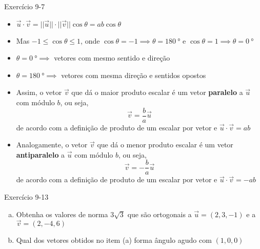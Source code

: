 \begin{frame}{Exercício 9-7}
    \begin{itemize}
        \item \(
            \vec{u}\cdot\vec{v}=||\vec{u}||\cdot ||\vec{v}||\cos{\theta}=
            ab\cos{\theta}
            \)
        \item Mas \(-1 \leq \cos{\theta} \leq 1\), onde \(
            \cos{\theta}=-1 \implies\theta=\SI{180}{\degree}\) e \(
            \cos{\theta}=1 \implies\theta=\SI{0}{\degree}\)
        \item \(\theta=\SI{0}{\degree} \implies \) vetores com mesmo sentido e direção
        \item \(\theta=\SI{180}{\degree} \implies \) vetores com mesma direção e sentidos opostos
        \item Assim, o vetor \(\vec{v}\) que dá o maior produto escalar é um vetor \textbf{paralelo} a \(\vec{u}\) com módulo \(b\), ou seja,
            \[
                \vec{v}=\frac{b}{a}\vec{u}
            \]
            de acordo com a definição de produto de um escalar por vetor e \(
            \vec{u}\cdot\vec{v}=ab\)

        \item Analogamente, o vetor \(\vec{v}\) que dá o menor produto escalar é um vetor \textbf{antiparalelo} a \(\vec{u}\) com módulo \(b\), ou seja,
            \[
                \vec{v}=-\frac{b}{a}\vec{u}
            \]
            de acordo com a definição de produto de um escalar por vetor e \(
            \vec{u}\cdot\vec{v}=-ab\)
    \end{itemize}

\end{frame}

\begin{frame}[c]{Exercício 9-13}
    \begin{enumerate}[(a)]
        \item Obtenha os valores de norma \(3\sqrt{3}\) que são ortogonais a \(\vec{u}=(2,3,-1)\) e a
            \(\vec{v}=(2,-4,6)\)
        \item Qual dos vetores obtidos no item (a) forma ângulo agudo com \((1,0,0)\)
    \end{enumerate}
\end{frame}

